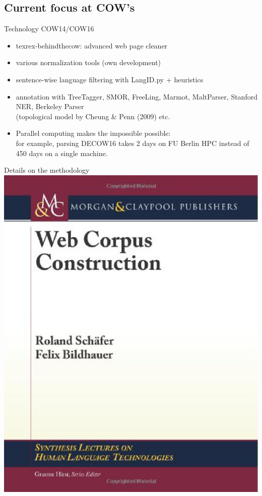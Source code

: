 \subsection{Current focus at COW's}

\begin{frame}
	{Technology COW14\slash COW16}

	\begin{itemize}
	  \item texrex-behindthecow: advanced web page cleaner
	  \item various normalization tools (own development)
	  \item sentence-wise language filtering with LangID.py + heuristics
	  \item annotation with TreeTagger, SMOR, FreeLing, Marmot, MaltParser, Stanford NER, Berkeley Parser\\
	    (topological model by Cheung \& Penn (2009) etc.

	  \vspace{0.5cm}
	   
	  \item Parallel computing makes the impossible possible:\\
		for example, parsing DECOW16 takes 2 days on
		FU Berlin HPC instead of 450 days on a single machine.
	\end{itemize}
\end{frame}

\begin{frame}
	{Details on the methodology}
	\centering
	\includegraphics[height=0.7\textheight]{graphics/wcc}
\end{frame}

